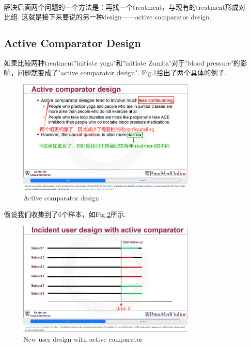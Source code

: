 解决后面两个问题的一个方法是：再找一个treatment，与现有的treatment形成对比组. 这就是接下来要说的另一种design——active comparator design.

\subsection{Active Comparator Design}
如果比较两种treatment"initiate yoga"和"initiate Zumba"对于"blood pressure"的影响，问题就变成了"active comparator design".
Fig.\ref{acd}给出了两个具体的例子.
\begin{figure}[htbp]
	\setlength{\abovecaptionskip}{0pt}     %
	\setlength{\belowcaptionskip}{10pt}
	\vspace{-0cm}  %
	\setlength{\abovecaptionskip}{-0cm}   %
	\setlength{\belowcaptionskip}{-0cm}   %
	\centering
	\includegraphics[width=0.8\textwidth]{figure/acd.png} 
	\caption{Active comparator design}
	\label{acd}
\end{figure} 

假设我们收集到了6个样本，如Fig.\ref{exacd}所示.
\begin{figure}[htbp]
	\setlength{\abovecaptionskip}{0pt}     %
	\setlength{\belowcaptionskip}{10pt}
	\vspace{-0cm}  %
	\setlength{\abovecaptionskip}{-0cm}   %
	\setlength{\belowcaptionskip}{-0cm}   %
	\centering
	\includegraphics[width=0.8\textwidth]{figure/exacd.png} 
	\caption{New user design with active comparator}
	\label{exacd}
\end{figure} 

